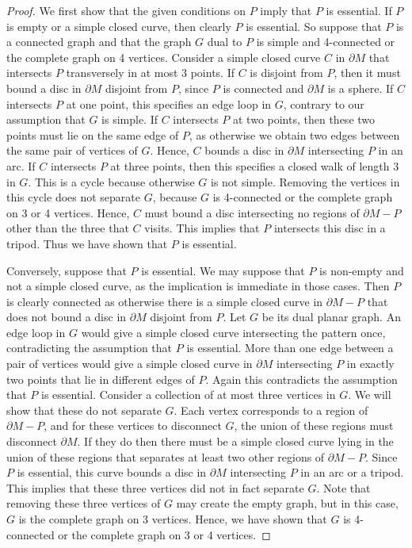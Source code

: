 \documentclass[oneside]{amsart}
\numberwithin{equation}{section}
\theoremstyle{plain}
\theoremstyle{definition}
\begin{document}
\begin{proof}
We first show that the given conditions on $P$ imply that $P$ is essential.
If $P$ is empty or a simple closed curve, then clearly $P$ is essential. So suppose that $P$ is a connected graph and that the graph $G$ dual to $P$ is simple and 4-connected or the complete graph on 4 vertices. Consider a simple closed curve $C$ in $\partial M$ that intersects $P$ transversely in at most 3 points. If $C$ is disjoint from $P$, then it must bound a disc in $\partial M$ disjoint from $P$, since $P$ is connected and $\partial M$ is a sphere. If $C$ intersects $P$ at one point, this specifies an edge loop in $G$, contrary to our assumption that $G$ is simple. If $C$ intersects $P$ at two points, then these two points must lie on the same edge of $P$, as otherwise we obtain two edges between the same pair of vertices of $G$. Hence, $C$ bounds a disc in $\partial M$ intersecting $P$ in an arc. If $C$ intersects $P$ at three points, then this specifies a closed walk of length 3 in $G$. This is a cycle because otherwise $G$ is not simple. Removing the vertices in this cycle does not separate $G$, because $G$ is 4-connected or the complete graph on 3 or 4 vertices. Hence, $C$ must bound a disc intersecting no regions of $\partial M - P$ other than the three that $C$ visits. This implies that $P$ intersects this disc in a tripod. Thus we have shown that $P$ is essential.

Conversely, suppose that $P$ is essential. We may suppose that $P$ is non-empty and not a simple closed curve, as the implication is immediate in those cases. Then $P$ is clearly connected as otherwise there is a simple closed curve in $\partial M - P$ that does not bound a disc in $\partial M$ disjoint from $P$.  Let $G$ be its dual planar graph. An edge loop in $G$ would give a simple closed curve intersecting the pattern once, contradicting the assumption that $P$ is essential. More than one edge between a pair of vertices would give a simple closed curve in $\partial M$ intersecting $P$ in exactly two points that lie in different edges of $P$. Again this contradicts the assumption that $P$ is essential. Consider a collection of at most three vertices in $G$. We will show that these do not separate $G$. Each vertex corresponds to a region of $\partial M - P$, and for these vertices to disconnect $G$, the union of these regions must disconnect $\partial M$. If they do then there must be a simple closed curve lying in the union of these regions that separates at least two other regions of $\partial M - P$. Since $P$ is essential, this curve bounds a disc in $\partial M$ intersecting $P$ in an arc or a tripod. This implies that these three vertices did not in fact separate $G$. Note that removing these three vertices of $G$ may create the empty graph, but in this case, $G$ is the complete graph on 3 vertices. Hence, we have shown that $G$ is 4-connected or the complete graph on 3 or 4 vertices.
\end{proof}
\end{document}

